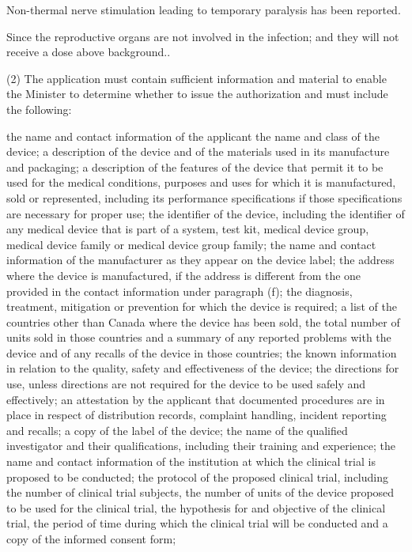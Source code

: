 \documentclass[fleqn,10pt]{paper}
\begin{document}
Non-thermal nerve stimulation leading to temporary paralysis has been reported. 

Since the reproductive organs are not involved in the infection; and they will not receive a dose above background.\cite{Organ2004}.









(2) The application must contain sufficient information and material to enable the Minister to determine whether to issue the authorization and must include the following:

the name and contact information of the applicant 
the name and class of the device;
a description of the device and of the materials used in its manufacture and packaging;
a description of the features of the device that permit it to be used for the medical conditions, purposes and uses for which it is manufactured, sold or represented, including its performance specifications if those specifications are necessary for proper use;
the identifier of the device, including the identifier of any medical device that is part of a system, test kit, medical device group, medical device family or medical device group family;
the name and contact information of the manufacturer as they appear on the device label;
the address where the device is manufactured, if the address is different from the one provided in the contact information under paragraph (f);
the diagnosis, treatment, mitigation or prevention for which the device is required;
a list of the countries other than Canada where the device has been sold, the total number of units sold in those countries and a summary of any reported problems with the device and of any recalls of the device in those countries;
the known information in relation to the quality, safety and effectiveness of the device;
the directions for use, unless directions are not required for the device to be used safely and effectively;
an attestation by the applicant that documented procedures are in place in respect of distribution records, complaint handling, incident reporting and recalls;
a copy of the label of the device;
the name of the qualified investigator and their qualifications, including their training and experience;
the name and contact information of the institution at which the clinical trial is proposed to be conducted;
the protocol of the proposed clinical trial, including the number of clinical trial subjects, the number of units of the device proposed to be used for the clinical trial, the hypothesis for and objective of the clinical trial, the period of time during which the clinical trial will be conducted and a copy of the informed consent form;
\end{document}
